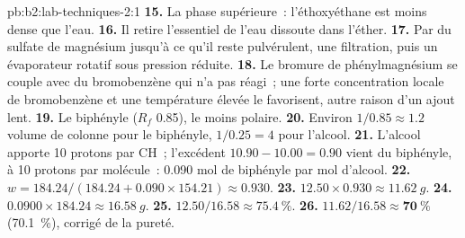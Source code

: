 \begin{solution}{pb:b2:lab-techniques-2:1}
\textbf{15.} La phase supérieure~: l'éthoxyéthane est moins dense que l'eau.
\textbf{16.} Il retire l'essentiel de l'eau dissoute dans l'éther.
\textbf{17.} Par du sulfate de magnésium jusqu'à ce qu'il reste pulvérulent, une filtration, puis un
évaporateur rotatif sous pression réduite.
\textbf{18.} Le bromure de phénylmagnésium se couple avec du bromobenzène qui n'a pas réagi~; une forte
concentration locale de bromobenzène et une température élevée le favorisent, autre raison d'un ajout lent.
\textbf{19.} Le biphényle ($R_f$ 0.85), le moins polaire.
\textbf{20.} Environ $1/0.85 \approx 1.2$ volume de colonne pour le biphényle, $1/0.25 = 4$ pour l'alcool.
\textbf{21.} L'alcool apporte 10 protons  par CH~; l'excédent $10.90 - 10.00 = 0.90$ vient du
biphényle, à 10 protons par molécule~: 0.090 mol de biphényle par mol d'alcool.
\textbf{22.} $w = 184.24/(184.24 + 0.090 \times 154.21) \approx 0.930$.
\textbf{23.} $12.50 \times 0.930 \approx \qty{11.62}{g}$.
\textbf{24.} $0.0900 \times 184.24 \approx \qty{16.58}{g}$.
\textbf{25.} $12.50/16.58 \approx 75.4~\%$.
\textbf{26.} $11.62/16.58 \approx \boldsymbol{70~\%}$ (70.1~\%), corrigé de la pureté.
\end{solution}
